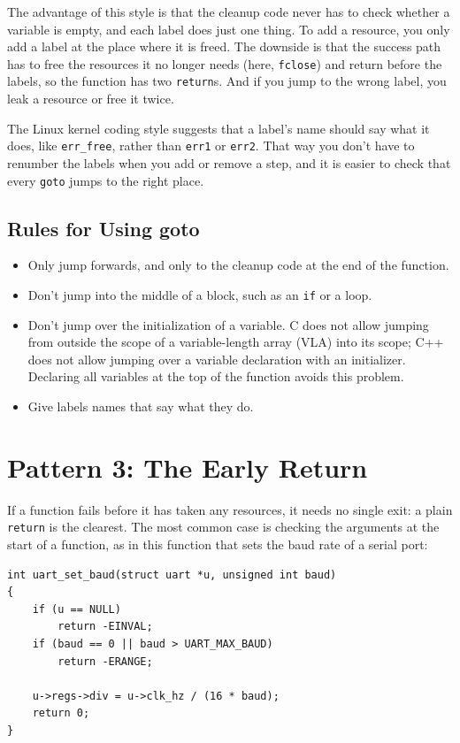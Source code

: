 The advantage of this style is that the cleanup code never has to check whether a variable is empty, and each label does just one thing. To add a resource, you only add a label at the place where it is freed. The downside is that the success path has to free the resources it no longer needs (here, \texttt{fclose}) and return before the labels, so the function has two \texttt{return}s. And if you jump to the wrong label, you leak a resource or free it twice.

The Linux kernel coding style suggests that a label's name should say what it does, like \texttt{err\_free}, rather than \texttt{err1} or \texttt{err2}. That way you don't have to renumber the labels when you add or remove a step, and it is easier to check that every \texttt{goto} jumps to the right place.

\subsection{Rules for Using goto}

\begin{itemize}
  \item Only jump forwards, and only to the cleanup code at the end of the function.
  \item Don't jump into the middle of a block, such as an \texttt{if} or a loop.
  \item Don't jump over the initialization of a variable. C does not allow jumping from outside the scope of a variable-length array (VLA) into its scope; C++ does not allow jumping over a variable declaration with an initializer. Declaring all variables at the top of the function avoids this problem.
  \item Give labels names that say what they do.
\end{itemize}

\section{Pattern 3: The Early Return}
\label{sec:early-return}

If a function fails before it has taken any resources, it needs no single exit: a plain \texttt{return} is the clearest. The most common case is checking the arguments at the start of a function, as in this function that sets the baud rate of a serial port:
\begin{verbatim}
int uart_set_baud(struct uart *u, unsigned int baud)
{
    if (u == NULL)
        return -EINVAL;
    if (baud == 0 || baud > UART_MAX_BAUD)
        return -ERANGE;

    u->regs->div = u->clk_hz / (16 * baud);
    return 0;
}
\end{verbatim}

